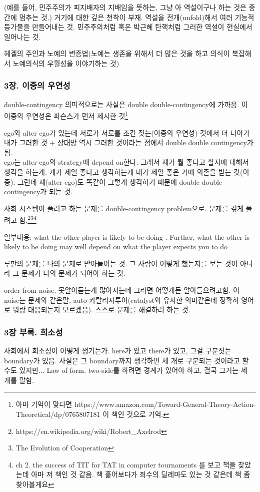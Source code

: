 \documentclass[11pt, a4paper]{article}
\begin{document}
(예를 들어, 민주주의가 피지배자의 지배임을 뜻하는, 그냥 아 역설이구나 하는 것은 중간에 멈추는 것.) 거기에 대한 깊은 천착이 부재. 역설을 전개(unfold)해서 여러 기능적 등가물을 만들어내는 것. 민주주의처럼 혹은 박근혜 탄핵처럼 그러한 역설이 현실에서 일어나는 것. 

헤겔의 주인과 노예의 변증법(노예는 생존을 위해서 더 많은 것을 하고 의식이 복잡해서 노예의식의 우월성을 이야기하는 것)

\subsubsection{3장. 이중의 우연성}
double-contingency
의미적으로는 사실은 double double-contingency에 가까움. 이 이중의 우연성은 파슨스가 먼저 제시한 것\footnote{아마 기억이 맞다면 https://www.amazon.com/Toward-General-Theory-Action-Theoretical/dp/0765807181 이 책인 것으로 기억.}

ego와 alter ego가 있는데 서로가 서로를 조건 짓는(이중의 우연성) 것에서 더 나아가 내가 그러한 것 + 상대방 역시 그러한 것이라는 점에서 double double contingency가 됨. \\

ego는 alter ego의 strategy에 depend on한다. 그래서 쟤가 뭘 좋다고 할지에 대해서 생각을 하는게. 걔가 제일 좋다고 생각하는게 내가 제일 좋은 거에 의존을 받는 것(이중). 그런데 쟤(alter ego)도 똑같이 그렇게 생각하기 때문에 double double contingency가 되는 것.

사회 시스템이 풀려고 하는 문제를 double-contingency problem으로. 문제를 깊게 풀려고 함.\footnote{https://en.wikipedia.org/wiki/Robert_Axelrod}\footnote{The Evolution of Cooperation}\footnote{ch 2. the success of TIT for TAT in computer tournaments 를 보고 책을 찾았는데 아마 저 책인 것 같음. 책 훑어보다가 죄수의 딜레마도 있는 것 같은데 책 좀 찾아볼게요}

일부내용: what the other player is likely to be doing . Further, what the other is likely to be doing may well depend on what the player expects you to do

루만의 문제를 나의 문제로 받아들이는 것. 그 사람이 어떻게 했는지를 보는 것이 아니라 그 문제가 나의 문제가 되어야 하는 것.

order from noise. 못알아듣는게 많아지는데 그러면 어떻게든 알아들으려고함. 이 noise는 문제와 같은말. auto-카탈리자투아(catalyst와 유사한 의미같은데 정확히 영어로 뭐랑 대응되는지 모르겠음). 스스로 문제를 해결하려 하는 것.

\subsubsection{3장 부록. 희소성}
사회에서 희소성이 어떻게 생기는가. here가 있고 there가 있고, 그걸 구분짓는 boundary가 있음. 사실은 그 boundary까지 생각하면 세 개로 구분되는 것이라고 할 수도 있지만... Law of form. two-side를 하려면 경계가 있어야 하고, 결국 그거는 세 개를 말함.
\end{document}
